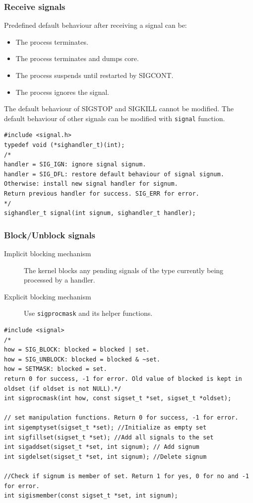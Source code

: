 \subsubsection{Receive signals}
Predefined default behaviour after receiving a signal can be:
\begin{itemize}
	\item The process terminates.
	\item The process terminates and dumps core.
	\item The process suspends until restarted by SIGCONT.
	\item The process ignores the signal.
\end{itemize}
The default behaviour of SIGSTOP and SIGKILL cannot be modified. The default behaviour of other signals can be modified with \texttt{signal} function.
\begin{lstlisting}[frame=single]
#include <signal.h>
typedef void (*sighandler_t)(int);
/*
handler = SIG_IGN: ignore signal signum.
handler = SIG_DFL: restore default behaviour of signal signum.
Otherwise: install new signal handler for signum. 
Return previous handler for success. SIG_ERR for error.
*/
sighandler_t signal(int signum, sighandler_t handler);
\end{lstlisting}
\subsubsection{Block/Unblock signals}
\begin{description}
	\item[Implicit blocking mechanism]The kernel blocks any pending signals of the type currently being processed by a handler.
	\item[Explicit blocking mechanism]Use \texttt{sigprocmask} and its helper functions.
\end{description}
\begin{lstlisting}[frame=single]
#include <signal>
/*
how = SIG_BLOCK: blocked = blocked | set.
how = SIG_UNBLOCK: blocked = blocked & ~set. 
how = SETMASK: blocked = set. 
return 0 for success, -1 for error. Old value of blocked is kept in oldset (if oldset is not NULL).*/
int sigprocmask(int how, const sigset_t *set, sigset_t *oldset);

// set manipulation functions. Return 0 for success, -1 for error.
int sigemptyset(sigset_t *set); //Initialize as empty set
int sigfillset(sigset_t *set); //Add all signals to the set
int sigaddset(sigset_t *set, int signum); // Add signum
int sigdelset(sigset_t *set, int signum); //Delete signum

//Check if signum is member of set. Return 1 for yes, 0 for no and -1 for error.
int sigismember(const sigset_t *set, int signum);
\end{lstlisting}
